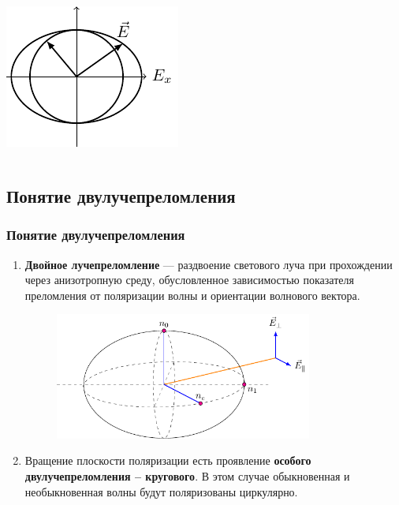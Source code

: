\documentclass[10pt,pdf,hyperref={unicode}, dvipsnames]{beamer}
\begin{document}
\begin{frame}
\begin{columns}
\begin{column}{0.3\textwidth}
			\includegraphics[width=\textwidth]{images/elleptical_polarisation}
		\end{column}
	\end{columns}
	
\end{frame}


\begin{frame}[t]
	\subsection{Понятие двулучепреломления}
	\frametitle{Понятие двулучепреломления}
	\begin{enumerate}
		\item \textbf{Двойное лучепреломление} — раздвоение светового луча при прохождении через анизотропную среду, обусловленное зависимостью показателя преломления от поляризации волны и ориентации волнового вектора.\vspace{-1em}
		      \begin{figure}[tb]
			      \centering
			      \includegraphics[width=0.8\textwidth]{images/double}
		      \end{figure}
		\item Вращение плоскости поляризации есть проявление \textbf{особого двулучепреломления -- кругового}. В этом случае обыкновенная и необыкновенная волны будут поляризованы циркулярно.
	\end{enumerate}
	
	
\end{frame}
\end{document}
